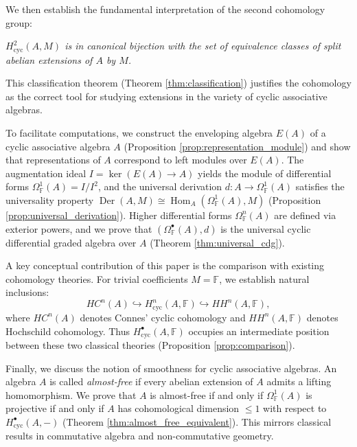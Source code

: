 \documentclass[pdflatex,sn-mathphys-num]{sn-jnl}%
\theoremstyle{thmstyleone}%
\theoremstyle{thmstyletwo}%
\theoremstyle{thmstylethree}%
\begin{document}
We then establish the fundamental interpretation of the second cohomology group:

\begin{center}
\emph{$H^2_{\mathrm{cyc}}(A, M)$ is in canonical bijection with the set of equivalence classes of split abelian extensions of $A$ by $M$.}
\end{center}

This classification theorem (Theorem \ref{thm:classification}) justifies the cohomology as the correct tool for studying extensions in the variety of cyclic associative algebras.

To facilitate computations, we construct the enveloping algebra $E(A)$ of a cyclic associative algebra $A$ (Proposition \ref{prop:representation_module}) and show that representations of $A$ correspond to left modules over $E(A)$. The augmentation ideal $I = \ker(E(A) \to A)$ yields the module of differential forms $\Omega^1_{\mathbb{F}}(A) = I/I^2$, and the universal derivation $d: A \to \Omega^1_{\mathbb{F}}(A)$ satisfies the universality property $\operatorname{Der}(A, M) \cong \operatorname{Hom}_A(\Omega^1_{\mathbb{F}}(A), M)$ (Proposition \ref{prop:universal_derivation}). Higher differential forms $\Omega^n_{\mathbb{F}}(A)$ are defined via exterior powers, and we prove that $(\Omega^\bullet_{\mathbb{F}}(A), d)$ is the universal cyclic differential graded algebra over $A$ (Theorem \ref{thm:universal_cdg}).

A key conceptual contribution of this paper is the comparison with existing cohomology theories. For trivial coefficients $M = \mathbb{F}$, we establish natural inclusions:
\[
HC^n(A) \hookrightarrow H^n_{\mathrm{cyc}}(A, \mathbb{F}) \hookrightarrow HH^n(A, \mathbb{F}),
\]
where $HC^n(A)$ denotes Connes' cyclic cohomology and $HH^n(A, \mathbb{F})$ denotes Hochschild cohomology. Thus $H^\bullet_{\mathrm{cyc}}(A, \mathbb{F})$ occupies an intermediate position between these two classical theories (Proposition \ref{prop:comparison}).

Finally, we discuss the notion of smoothness for cyclic associative algebras. An algebra $A$ is called \textit{almost-free} if every abelian extension of $A$ admits a lifting homomorphism. We prove that $A$ is almost-free if and only if $\Omega^1_{\mathbb{F}}(A)$ is projective if and only if $A$ has cohomological dimension $\le 1$ with respect to $H^\bullet_{\mathrm{cyc}}(A, -)$ (Theorem \ref{thm:almost_free_equivalent}). This mirrors classical results in commutative algebra and non-commutative geometry.
\end{document}
